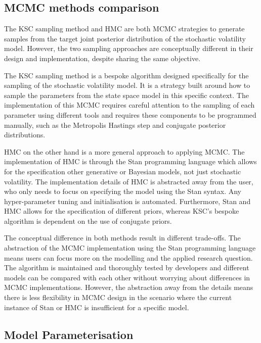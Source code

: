 \documentclass[12pt, a4paper]{article}
\begin{document}
    \subsection{MCMC methods comparison}
        The KSC sampling method and HMC are both MCMC strategies to generate samples from the target joint posterior distribution of the stochastic volatility model. However, the two sampling approaches are conceptually different in their design and implementation, despite sharing the same objective.
        
        The KSC sampling method is a bespoke algorithm designed specifically for the sampling of the stochastic volatility model. It is a strategy built around how to sample the parameters from the state space model in this specific context. The implementation of this MCMC requires careful attention to the sampling of each parameter using different tools and requires these components to be programmed manually, such as the Metropolis Hastings step and conjugate posterior distributions. 
    
        HMC on the other hand is a more general approach to applying MCMC. The implementation of HMC is through the Stan programming language which allows for the specification other generative or Bayesian models, not just stochastic volatility. The implementation details of HMC is abstracted away from the user, who only needs to focus on specifying the model using the Stan syntax. Any hyper-parameter tuning and initialisation is automated. Furthermore, Stan and HMC allows for the specification of different priors, whereas KSC's bespoke algorithm is dependent on the use of conjugate priors. 

        The conceptual difference in both methods result in different trade-offs. The abstraction of the MCMC implementation using the Stan programming language means users can focus more on the modelling and the applied research question. The algorithm is maintained and thoroughly tested by developers and different models can be compared with each other without worrying about differences in MCMC implementations. However, the abstraction away from the details means there is less flexibility in MCMC design in the scenario where the current instance of Stan or HMC is insufficient for a specific model.
        
    \subsection{Model Parameterisation}
\end{document}
